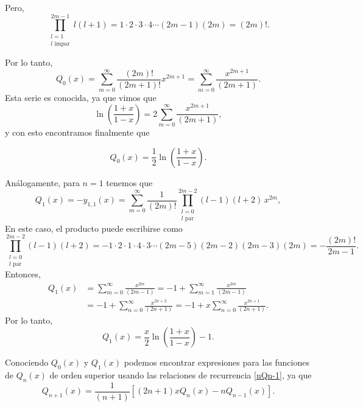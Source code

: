 Pero,
\begin{equation}
\prod_{\substack{l=1 \\ l \text{ impar}}}^{2m-1}l(l+1)=1\cdot 2\cdot 3\cdot 4\cdots (2m-1)(2m)=(2m)!.
\end{equation}

Por lo tanto, 
\begin{equation}
Q_0(x)=\sum_{m=0}^\infty\frac{(2m)!}{(2m+1)!}x^{2m+1} =\sum_{m=0}^\infty\frac{x^{2m+1}}{(2m+1)}.
\end{equation}
Esta serie es conocida, ya que vimos que
\begin{equation}
\ln\left(\frac{1+x}{1-x}\right)=2\sum_{m=0}^\infty\frac{x^{2m+1}}{(2m+1)},
\end{equation}
y con esto encontramos finalmente que

\begin{equation}
\boxed{Q_0(x)=\frac{1}{2}\ln\left(\frac{1+x}{1-x}\right).}
\end{equation}

Análogamente, para $n=1$ tenemos que
\begin{equation}
Q_1(x)=-y_{1,1}(x)=\sum_{m=0}^\infty\frac{1}{(2m)!}
\prod_{\substack{l=0 \\ l \text{ par}}}^{2m-2}(l-1)(l+2)\,x^{2m},
\end{equation}
En este caso, el producto puede escribirse como
\begin{equation}
\prod_{\substack{l=0 \\ l \text{ par}}}^{2m-2}(l-1)(l+2)=-1\cdot 2\cdot 1\cdot 4\cdot 3\cdots (2m-5)(2m-2)(2m-3)(2m)=-\frac{(2m)!}{2m-1}.
\end{equation}
Entonces,
\begin{align}
Q_1(x) &= \sum_{m=0}^\infty\frac{x^{2m}}{(2m-1)} =-1+\sum_{m=1}^\infty\frac{x^{2m}}{(2m-1)} \\
&= -1+\sum_{n=0}^\infty\frac{x^{2n+2}}{(2n+1)}
=-1+x\sum_{n=0}^\infty\frac{x^{2n+1}}{(2n+1)}.
\end{align}
Por lo tanto,
\begin{equation}
\boxed{Q_1(x)=\frac{x}{2}\ln\left(\frac{1+x}{1-x}\right)-1.}
\end{equation}

Conociendo $Q_0(x)$ y $Q_1(x)$ podemos encontrar expresiones para las funciones de $Q_n(x)$ de orden superior usando las relaciones de recurrencia \eqref{nQn-1}, ya que
\begin{equation}
Q_{n+1}(x)=\frac{1}{(n+1)}\left[(2n+1)xQ_n(x)-nQ_{n-1}(x)\right].
\end{equation} 


